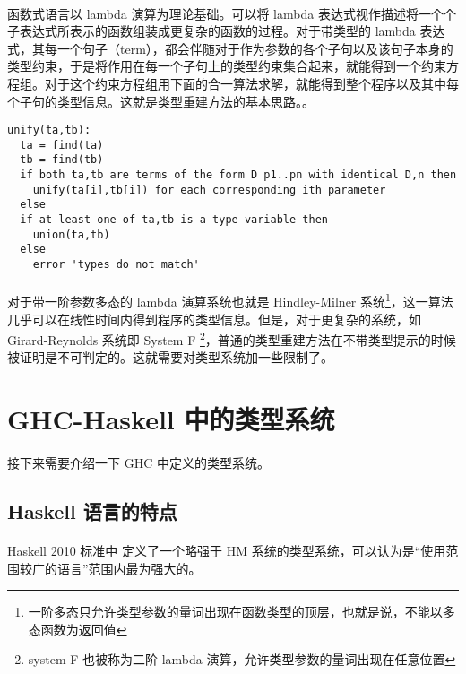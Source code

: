 \documentclass{article}
\begin{document}
	\paragraph{}
	函数式语言以 lambda 演算为理论基础。可以将 lambda 表达式视作描述将一个个子表达式所表示的函数组装成更复杂的函数的过程。对于带类型的 lambda 表达式，其每一个句子（term），都会伴随对于作为参数的各个子句以及该句子本身的类型约束，于是将作用在每一个子句上的类型约束集合起来，就能得到一个约束方程组。对于这个约束方程组用下面的合一算法求解，就能得到整个程序以及其中每个子句的类型信息。这就是类型重建方法的基本思路。\cite{hindley1969}\cite{MILNER1978348}。
\begin{verbatim}
unify(ta,tb):
  ta = find(ta)
  tb = find(tb)
  if both ta,tb are terms of the form D p1..pn with identical D,n then
    unify(ta[i],tb[i]) for each corresponding ith parameter
  else
  if at least one of ta,tb is a type variable then
    union(ta,tb)
  else
    error 'types do not match'
\end{verbatim}
	\paragraph{}
	对于带一阶参数多态的 lambda 演算系统也就是 Hindley-Milner 系统\footnote{一阶多态只允许类型参数的量词出现在函数类型的顶层，也就是说，不能以多态函数为返回值}，这一算法几乎可以在线性时间内得到程序的类型信息。但是，对于更复杂的系统，如 Girard-Reynolds 系统即 System F \footnote{system F 也被称为二阶 lambda 演算，允许类型参数的量词出现在任意位置}，普通的类型重建方法在不带类型提示的时候被证明是不可判定的\cite{WELLS1999111}。这就需要对类型系统加一些限制了。

	\section{GHC-Haskell 中的类型系统}
	\paragraph{}
	接下来需要介绍一下 GHC 中定义的类型系统。
	\subsection{Haskell 语言的特点}
	\paragraph{}
	Haskell 2010 标准中\cite{haskell2010} 定义了一个略强于 HM 系统的类型系统，可以认为是“使用范围较广的语言”范围内最为强大的。
\end{document}
